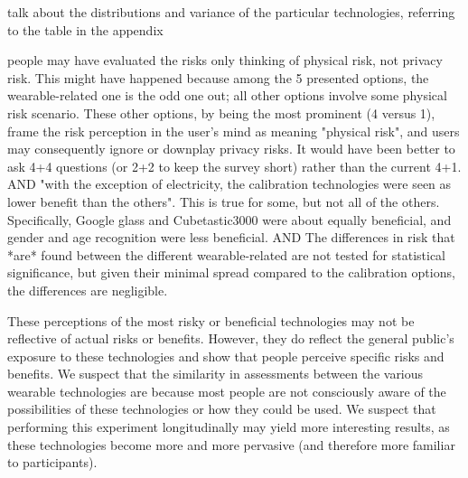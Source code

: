 {\color {red} talk about the distributions and variance of the particular technologies, referring to the table in the appendix}

{\color {red} people may have evaluated the risks only thinking of physical risk, not privacy risk. This might have happened because among the 5 presented options, the wearable-related one is the odd one out; all other options involve some physical risk scenario. These other options, by being the most prominent (4 versus 1), frame the risk perception in the user's mind as meaning "physical risk", and users may consequently ignore or downplay privacy risks. It would have been better to ask 4+4  questions (or 2+2 to keep the survey short) rather than the current 4+1. AND "with the exception of electricity, the calibration technologies were seen as lower benefit than the others". This is true for some, but not all of the others. Specifically, Google glass and Cubetastic3000 were about equally beneficial, and gender and age recognition were less beneficial. AND The differences in risk that *are* found between the different wearable-related are not tested for statistical significance, but given their minimal spread compared to the calibration options, the differences are negligible.}

These perceptions of the most risky or beneficial technologies may not be reflective of actual risks or benefits. However, they do reflect the general public's exposure to these technologies and show that people perceive specific risks and benefits. We suspect that the similarity in assessments between the various wearable technologies are because most people are not consciously aware of the possibilities of these technologies or how they could be used. We suspect that performing this experiment longitudinally may yield more interesting results, as these technologies become more and more pervasive (and therefore more familiar to participants).